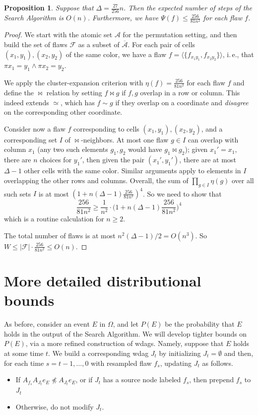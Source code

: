 \documentclass[11pt]{article}
\newtheorem{proposition}[theorem]{Proposition}
\newcommand{\ie}{i.\,e.}
\newcommand\oa{\overline{\mathcal A}}
\begin{document}
\begin{proposition}
  \label{latin-prop}
  Suppose that $\Delta = \frac{27}{256} n$. Then the expected number of steps of the Search Algorithm is $O(n)$. Furthermore,  we have $\Psi(f) \leq \frac{256}{81 n^2}$ for each flaw $f$.
\end{proposition}
\begin{proof}
 We start with the atomic set $\mathcal A$ for the permutation setting, and then build the set of flaws $\mathcal F$ as a subset of $\oa$. For each pair of cells $(x_1, y_1), (x_2, y_2)$ of the same color, we have a flaw $f = \langle \{ f_{x_1 y_1}, f_{x_2 y_2} \} \rangle$, \ie, that $\pi x_1 = y_1 \wedge \pi x_2 = y_2$.
 
We apply the cluster-expansion criterion with $\eta(f) = \frac{256}{81 n^2}$ for each flaw $f$ and define the $\bowtie$ relation by setting $f \bowtie g$ if $f, g$ overlap in a row or column. This indeed extends $\simeq$, which has $f \sim g$ if they overlap on a coordinate and \emph{disagree} on the corresponding other coordinate.

Consider now a flaw $f$ corresponding to cells $(x_1, y_1), (x_2, y_2)$, and a corresponding set $I$ of $\bowtie$-neighbors. At most one flaw $g \in I$ can overlap with column $x_1$ (any two such elements $g_1, g_2$ would have $g_1 \bowtie g_2$); given $x_1' = x_1$, there are $n$ choices for $y_1'$, then given the pair $(x_1', y_1')$, there are at most $\Delta - 1$ other cells with the same color. Similar arguments apply to elements in $I$ overlapping the other rows and columns. Overall, the sum of $\prod_{g \in I} \eta(g)$ over all such sets $I$ is at most $(1 + n (\Delta-1)  \frac{256}{81 n^2})^4$. So we need to show that
$$
\frac{256}{81 n^2} \geq \frac{1}{n^2} \cdot \bigl( 1 + n (\Delta-1)  \frac{256}{81 n^2} \bigr)^4
$$
which is a routine calculation for $n \geq 2$. 

The total number of flaws is at most $n^2 (\Delta-1) / 2 = O(n^3)$. So $W \leq |\mathcal F| \cdot \frac{256}{81 n^2} \leq O(n)$.
\end{proof}
  
\section{More detailed distributional bounds}
\label{sec:detailedist}
As before, consider an event $E$ in $\Omega$, and let $P(E)$ be the probability that $E$ holds in the output of the Search Algorithm.  We will develop tighter bounds on $P(E)$, via a more refined construction of wdags. Namely, suppose that $E$ holds at some time $t$. We build a corresponding wdag $J_t$ by initializing $J_t = \emptyset$ and then, for each time $s = t-1, \dots, 0$ with resampled flaw $f_s$, updating $J_t$ as follows. %
\begin{itemize}
\item If $A_{f_s} A_{J_t} e_E \not \preceq A_{J_t} e_E$,  or if $J_t$ has a source node labeled $f_s$, then prepend $f_s$ to $J_t$
\item Otherwise, do not modify $J_t$.
\end{itemize}
\end{document}
